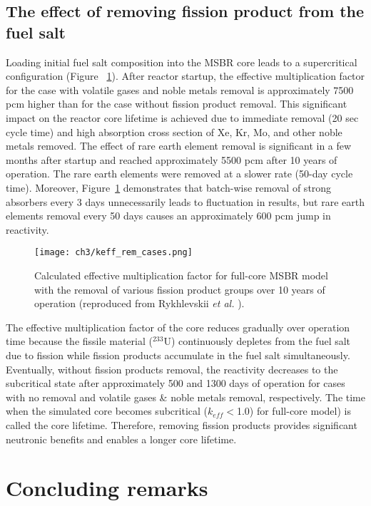 \subsection{The effect of removing fission product from the fuel salt}
Loading initial fuel salt composition into the \gls{MSBR} core leads to a 
supercritical configuration (Figure ~\ref{fig:fp_removal}). After reactor 
startup, the effective multiplication factor for the case with volatile gases 
and noble metals removal is approximately 7500 pcm  higher than for the case 
without fission product removal. This significant impact on the reactor core 
lifetime is achieved due to immediate removal (20 sec cycle time) and high 
absorption cross section of Xe, Kr, Mo, and other noble metals removed. The 
effect of rare earth element removal is significant in a few months after 
startup and reached approximately 5500 pcm after 10 years of operation. The 
rare earth elements were removed at a slower rate (50-day cycle time). 
Moreover, Figure~\ref{fig:fp_removal} demonstrates that batch-wise removal of 
strong absorbers every 3 days unnecessarily leads to fluctuation in 
results, but rare earth elements removal every 50 days causes an approximately 
600 pcm jump in reactivity.
\begin{figure}[ht!] %
	\centering
	\texttt{[image: ch3/keff\_rem\_cases.png]} 
	\caption{Calculated effective multiplication factor for full-core 
		\gls{MSBR} model with the removal of various fission product groups 
		over 10 years of operation (reproduced from Rykhlevskii \emph{et al.} 
		\cite{rykhlevskii_modeling_2019}).}
	\label{fig:fp_removal}
\end{figure}

The effective multiplication factor of the core reduces gradually over 
operation time because the fissile material ($^{233}$U) continuously depletes 
from the fuel salt due to fission while fission products accumulate in the 
fuel salt simultaneously. Eventually, without fission products removal, the 
reactivity decreases to the subcritical state after approximately 500 and 
1300 days of operation for cases with no removal and volatile gases \& noble 
metals removal, respectively. The time when the simulated core becomes  
subcritical ($k_{eff}<$1.0) for full-core model) is called the core 
lifetime. Therefore, removing fission products provides significant 
neutronic benefits and enables a longer core lifetime.


\section{Concluding remarks}

